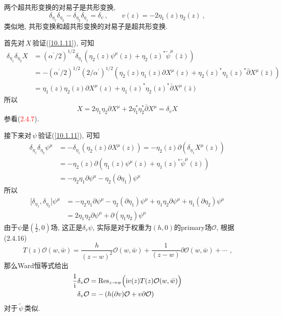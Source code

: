 两个超共形变换的对易子是共形变换,
\begin{equation}
    \delta_{\eta_{1}}\delta_{\eta_{2}}-\delta_{\eta_{2}}\delta_{\eta_{1}}=\delta_{v}\:,\qquad
    v(z)= -2\eta_{1}(z)\eta_{2}(z) \:, \label{10.1.11}
\end{equation}
类似地, 共形变换和超共形变换的对易子是超共形变换.
\begin{tcolorbox}
首先对$\,X\,$验证(\ref{10.1.11}), 可知
\begin{align*}
    \delta_{\eta_{1}}\delta_{\eta_{2}}X &=  (\alpha^{\prime}/2)^{1/2}
    \delta_{\eta_{1}}(\eta_{2}(z)\psi^{\mu}(z) + \eta_{2}(z)^{\ast} \tilde{\psi}^{\mu}(\bar{z})) \\
    &=-(\alpha^{\prime}/2)^{1/2} (2/\alpha^{\prime})^{1/2}
    (\eta_{2}(z)\eta_{1}(z)\partial X^{\mu}(z) + \eta_{2}(z)^{\ast} \eta_{1}(z)^{\ast}\bar{\partial}X^{\mu}(\bar{z}))  \\
    &=
    \eta_{1}(z)\eta_{2}(z)\partial X^{\mu}(z) +
    \eta_{1}(z)^{\ast} \eta_{2}(z)^{\ast}\bar{\partial}X^{\mu}(\bar{z})
\end{align*}
所以
\begin{equation*}
    [\delta_{\eta_{1}},\delta_{\eta_{2}}]X= 
     2\eta_{1}\eta_{2}\partial X^{\mu} + 2\eta_{1}^{\ast} \eta_{2}^{\ast}\bar{\partial}X^{\mu}
     =\delta_{v}X
\end{equation*}
参看(\textcolor{red}{2.4.7}).

接下来对$\,\psi\,$验证(\ref{10.1.11}),
可知\begin{align*}
\delta _{\eta _{1}}\delta _{\eta _{2}}\psi ^{\mu } &=-\delta _{\eta
_{1}}\left( \eta _{2}(z)\partial X^{\mu }(z)\right) =-\eta _{2}(z)\partial
(\delta _{\eta _{1}}X^{\mu }(z)) \\
&=-\eta _{2}(z)\partial (\eta _{1}(z)\psi ^{\mu }(z)+\eta _{1}(z)^{\ast }%
\tilde{\psi}^{\mu }(\bar{z})) \\
&=-\eta _{2}\eta _{1}\partial \psi ^{\mu }-\eta _{2}(\partial \eta
_{1})\psi ^{\mu }
\end{align*}%
所以\begin{align*}
\lbrack \delta _{\eta _{1}},\delta _{\eta _{2}}]\psi ^{\mu } &=-\eta
_{2}\eta _{1}\partial \psi ^{\mu }-\eta _{2}(\partial \eta _{1})\psi ^{\mu
}+\eta _{1}\eta _{2}\partial \psi ^{\mu }+\eta _{1}(\partial \eta _{2})\psi
^{\mu } \\
&=2\eta _{1}\eta _{2}\partial \psi ^{\mu }+\partial (\eta _{1}\eta
_{2})\psi ^{\mu }
\end{align*}%
由于$\psi $是$(\frac{1}{2},0)$场, 这正是$\delta _{v}\psi $, 实际是对于权重为$(h,0)$的primary场$\mathcal{O}$, 根据(2.4.16)%
\[
T(z)\mathcal{O}(w,\bar{w})=\frac{h}{(z-w)^{2}}\mathcal{O}(w,\bar{w})+\frac{1}{(z-w)}\partial \mathcal{O}(w,%
\bar{w})+\cdots \text{ ,}
\]%
那么Ward恒等式给出\begin{align*}
\frac{1}{\mi }\delta _{v}\mathcal{O} &=\operatorname{Res}_{z\to w}\Bigl(\mi v(z)T(z)\mathcal{O}(w,%
\bar{w})\Bigr) \\
\delta _{v}\mathcal{O} &=-\left( h(\partial v)\mathcal{O}+v\partial \mathcal{O}\right)
\end{align*}
对于$\,\tilde{\psi}\,$类似.


\end{tcolorbox}
